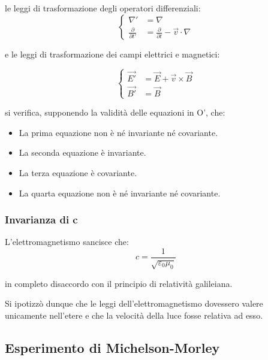 \documentclass{article}
\begin{document}
le leggi di trasformazione degli operatori differenziali:
\begin{equation}
    \left\{
    \begin{aligned}
        \nabla'                      & = \nabla                                             \\
        \frac{\partial}{\partial t'} & = \frac{\partial}{\partial t} - \vec{v} \cdot \nabla
    \end{aligned}
    \right.
\end{equation}

e le leggi di trasformazione dei campi elettrici e magnetici:

\begin{equation}
    \left\{
    \begin{aligned}
        \vec{E'} & = \vec{E} + \vec{v} \times \vec{B} \\
        \vec{B'} & = \vec{B}
    \end{aligned}
    \right.
\end{equation}


si verifica, supponendo la validità delle equazioni in O', che:
\begin{itemize}
    \item La prima equazione non è né invariante né covariante.
    \item La seconda equazione è invariante.
    \item La terza equazione è covariante.
    \item La quarta equazione non è né invariante né covariante.
\end{itemize}

\subsubsection{Invarianza di c}
L'elettromagnetismo sancisce che:
\begin{equation}
    c = \frac{1}{\sqrt{\varepsilon_0 \mu_0}}
\end{equation}

in completo disaccordo con il principio di relatività galileiana.

Si ipotizzò dunque che le leggi dell'elettromagnetismo dovessero valere unicamente nell'etere e che la velocità della luce fosse relativa ad esso.

\subsection{Esperimento di Michelson-Morley}
\end{document}
